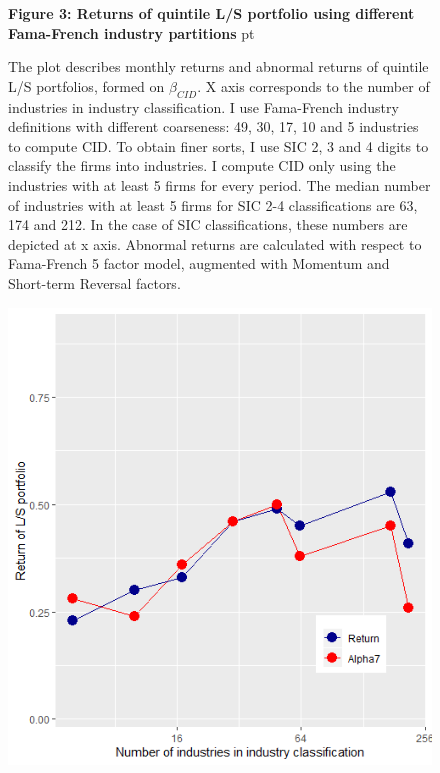 \documentclass[12pt]{article}
\begin{document}
\begin{figure}
\textbf{Figure 3: Returns of quintile L/S portfolio using different Fama-French industry partitions}
 pt
\begin{flushleft}
{The plot describes monthly returns and abnormal returns of quintile L/S portfolios, formed on $\beta_{CID}$. X axis corresponds to the number of industries in industry classification. I use Fama-French industry definitions with different coarseness: 49, 30, 17, 10 and 5 industries to compute CID. To obtain finer sorts, I use SIC 2, 3 and 4 digits to classify the firms into industries. I compute CID only using the industries with at least 5 firms for every period. The median number of industries with at least 5 firms for SIC 2-4 classifications are 63, 174 and 212. In the case of SIC classifications, these numbers are depicted at x axis.  Abnormal returns are calculated with respect to Fama-French 5 factor model, augmented with Momentum and Short-term Reversal factors.}
\end{flushleft}
\centering
\includegraphics[width=1\textwidth]{Figure3.png}
\end{figure}


\clearpage
\end{document}
